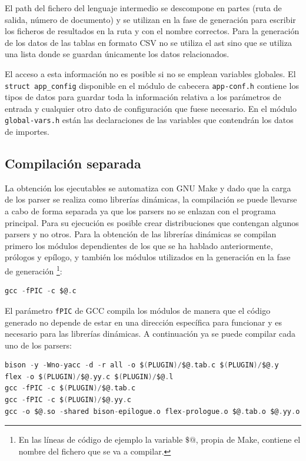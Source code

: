 El path del fichero del lenguaje intermedio se descompone en partes (ruta de salida, número de documento) y se utilizan en la fase de generación para escribir los ficheros de resultados en la ruta y con el nombre correctos. Para la generación de los datos de las tablas en formato CSV no se utiliza el \acrshort{ast} sino que se utiliza una lista donde se guardan únicamente los datos relacionados.

El acceso a esta información no es posible si no se emplean variables globales. El \verb|struct app_config| disponible en el módulo de cabecera \verb|app-conf.h| contiene los tipos de datos para guardar toda la información relativa a los parámetros de entrada y cualquier otro dato de configuración que fuese necesario. En el módulo \verb|global-vars.h| están las declaraciones de las variables que contendrán los datos de importes.

\subsection{Compilación separada}

La obtención los ejecutables se automatiza con GNU Make y dado que la carga de los parser se realiza como librerías dinámicas, la compilación se puede llevarse a cabo de forma separada ya que los parsers no se enlazan con el programa principal. Para su ejecución es posible crear distribuciones que contengan algunos parsers y no otros.
Para la obtención de las librerías dinámicas se compilan primero los módulos dependientes de los que se ha hablado anteriormente, prólogos y epílogo, y también los módulos utilizados en la generación en la fase de generación \footnote{En las líneas de código de ejemplo la variable $ \$@ $, propia de Make, contiene el nombre del fichero que se va a compilar.}:

\begin{lstlisting}[language=C,caption={},label={}]
gcc -fPIC -c $@.c
\end{lstlisting}

El parámetro \verb|fPIC| de GCC compila los módulos de manera que el código generado no depende de estar en una dirección específica para funcionar y es necesario para las librerías dinámicas. A continuación ya se puede compilar cada uno de los parsers:

\begin{lstlisting}[language=C,caption={},label={}]
bison -y -Wno-yacc -d -r all -o $(PLUGIN)/$@.tab.c $(PLUGIN)/$@.y
flex -o $(PLUGIN)/$@.yy.c $(PLUGIN)/$@.l
gcc -fPIC -c $(PLUGIN)/$@.tab.c
gcc -fPIC -c $(PLUGIN)/$@.yy.c
gcc -o $@.so -shared bison-epilogue.o flex-prologue.o $@.tab.o $@.yy.o
\end{lstlisting}

